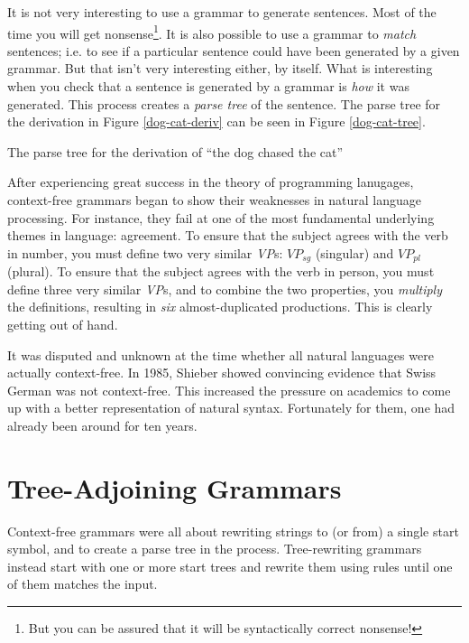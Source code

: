 \documentclass[12pt]{article}
\newcommand{\defn}[1]{\textit{#1}}
\begin{document}
It is not very interesting to use a grammar to generate sentences.  Most
of the time you will get nonsense\footnote{But you can be assured that
it will be syntactically correct nonsense!}.  It is also possible to use
a grammar to \textit{match} sentences; i.e. to see if a particular
sentence could have been generated by a given grammar.   But that isn't
very interesting either, by itself.  What is interesting when you
check that a sentence is generated by a grammar is \textit{how} it was
generated.  This process creates a \defn{parse tree} of the sentence.
The parse tree for the derivation in Figure \ref{dog-cat-deriv} can be
seen in Figure \ref{dog-cat-tree}.

\begin{Figure}
\caption{The parse tree for the derivation of ``the dog chased the
cat''}
\label{dog-cat-tree}
\end{Figure}

After experiencing great success in the theory of programming lanugages,
context-free grammars began to show their weaknesses in natural language
processing.  For instance, they fail at one of the most fundamental
underlying themes in language: agreement.  To ensure that the subject
agrees with the verb in number, you must define two very similar
\textit{VP}s: $\mathit{VP}_\mathit{sg}$ (singular) and
$\mathit{VP}_\mathit{pl}$ (plural).  To ensure that the subject agrees
with the verb in person, you must define three very similar
\textit{VP}s, and to combine the two properties, you \textit{multiply}
the definitions, resulting in \textit{six} almost-duplicated
productions.  This is clearly getting out of hand.

It was disputed and unknown at the time whether all natural languages
were actually context-free.  In 1985, Shieber\cite{Shieber-1985} showed
convincing evidence that Swiss German was not context-free.  This
increased the pressure on academics to come up with a better
representation of natural syntax.  Fortunately for them, one had already
been around for ten years.

\section{Tree-Adjoining Grammars}

Context-free grammars were all about rewriting strings to (or from) a
single start symbol, and to create a parse tree in the process.
Tree-rewriting grammars instead start with one or more start trees and
rewrite them using rules until one of them matches the input. 
\end{document}
